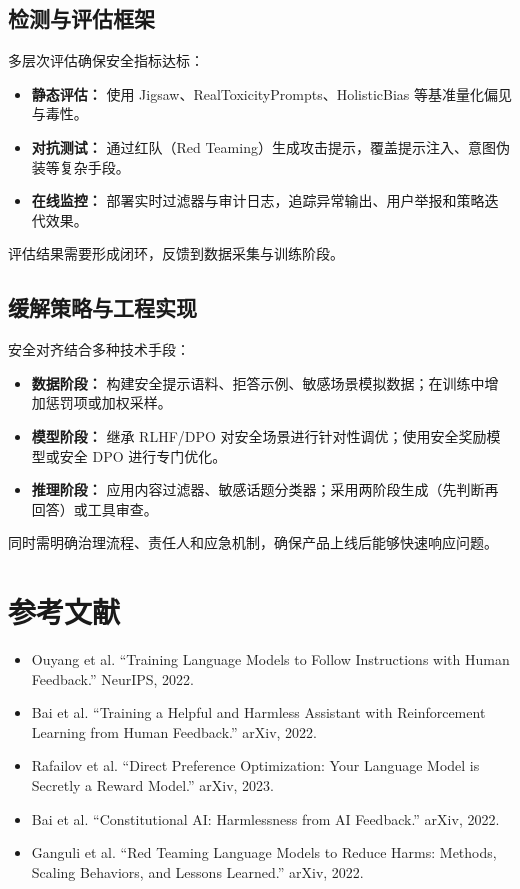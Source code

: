 \documentclass[UTF8,zihao=-4]{ctexart}
\begin{document}
\subsection{检测与评估框架}
多层次评估确保安全指标达标：
\begin{itemize}
  \item \textbf{静态评估：} 使用 Jigsaw、RealToxicityPrompts、HolisticBias 等基准量化偏见与毒性。
  \item \textbf{对抗测试：} 通过红队（Red Teaming）生成攻击提示，覆盖提示注入、意图伪装等复杂手段。
  \item \textbf{在线监控：} 部署实时过滤器与审计日志，追踪异常输出、用户举报和策略迭代效果。
\end{itemize}
评估结果需要形成闭环，反馈到数据采集与训练阶段。

\subsection{缓解策略与工程实现}
安全对齐结合多种技术手段：
\begin{itemize}
  \item \textbf{数据阶段：} 构建安全提示语料、拒答示例、敏感场景模拟数据；在训练中增加惩罚项或加权采样。
  \item \textbf{模型阶段：} 继承 RLHF/DPO 对安全场景进行针对性调优；使用安全奖励模型或安全 DPO 进行专门优化。
  \item \textbf{推理阶段：} 应用内容过滤器、敏感话题分类器；采用两阶段生成（先判断再回答）或工具审查。
\end{itemize}
同时需明确治理流程、责任人和应急机制，确保产品上线后能够快速响应问题。

\section*{参考文献}
\begin{itemize}
  \item Ouyang et al. ``Training Language Models to Follow Instructions with Human Feedback.'' NeurIPS, 2022.
  \item Bai et al. ``Training a Helpful and Harmless Assistant with Reinforcement Learning from Human Feedback.'' arXiv, 2022.
  \item Rafailov et al. ``Direct Preference Optimization: Your Language Model is Secretly a Reward Model.'' arXiv, 2023.
  \item Bai et al. ``Constitutional AI: Harmlessness from AI Feedback.'' arXiv, 2022.
  \item Ganguli et al. ``Red Teaming Language Models to Reduce Harms: Methods, Scaling Behaviors, and Lessons Learned.'' arXiv, 2022.
\end{itemize}
\end{document}
